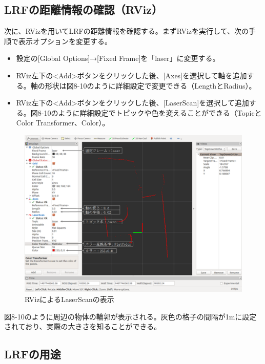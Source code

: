 \subsection{LRFの距離情報の確認（RViz）}

次に、RVizを用いてLRFの距離情報を確認する。まずRVizを実行して、次の手順で表示オプションを変更する。

\begin{itemize}
\item 設定の[Global Options]→[Fixed Frame]を「laser」に変更する。
\item RViz左下の<Add>ボタンをクリックした後、[Axes]を選択して軸を追加する。軸の形状は図8-10のように詳細設定で変更できる（LengthとRadius）。
\item RViz左下の<Add>ボタンをクリックした後、[LaserScan]を選択して追加する。図8-10のように詳細設定でトピックや色を変えることができる（TopicとColor Transformer、Color）。
\end{itemize}

\begin{figure}[ht]
  \centering
  \includegraphics[width=\columnwidth]{pictures/chapter8/pic_08_10.png}
  \caption{RVizによるLaserScanの表示}
\end{figure}

図8-10のように周辺の物体の輪郭が表示される。灰色の格子の間隔が1mに設定されており、実際の大きさを知ることができる。

\subsection{LRFの用途}

